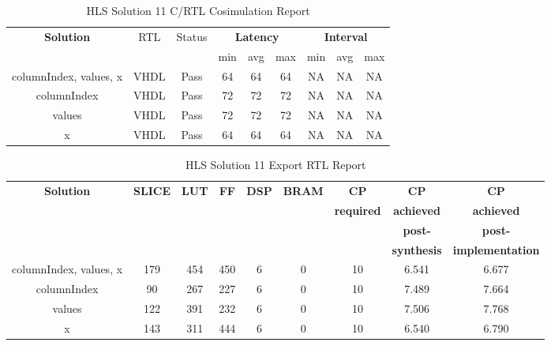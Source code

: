 \begin{table}[H]
	\centering
	\begin{tabular}{|c|c|c|c|c|c|c|c|c|}
		\hline
		\multicolumn{1}{|c|}{\textbf{Solution}} & \multicolumn{1}{|c|}{RTL} & \multicolumn{1}{|c|}{Status} & \multicolumn{3}{c|}{\textbf{Latency}} & \multicolumn{3}{c|}{\textbf{Interval}} \\
		& &  & min & avg & max & min & avg & max \\
		\hline
		columnIndex, values, x & VHDL & Pass & 64 & 64 & 64 & NA & NA & NA \\
		\hline
		columnIndex & VHDL & Pass & 72 & 72 & 72 & NA & NA & NA \\
		\hline
		values & VHDL & Pass & 72 & 72 & 72 & NA & NA & NA \\
		\hline
		x & VHDL & Pass & 64 & 64 & 64 & NA & NA & NA \\
		\hline
	\end{tabular}
	\caption{HLS Solution 11 C/RTL Cosimulation Report }
	\label{tab:hls-solution-11-cosimulation-report}
\end{table}

\begin{table}[H]
	\centering
	\begin{tabular}{|c|c|c|c|c|c|c|c|c|}
		\hline
		\textbf{Solution} & \textbf{SLICE} & \textbf{LUT} & \textbf{FF} & \textbf{DSP} & \textbf{BRAM} & \textbf{CP} & \textbf{CP} & \textbf{CP} \\
		& & & & & & \textbf{required} & \textbf{achieved} & \textbf{achieved}\\
		& & & & & & & \textbf{post-} & \textbf{post-}\\
		& & & & & & & \textbf{synthesis} & \textbf{implementation}\\
		\hline
		columnIndex, values, x  & 179 & 454 & 450 & 6 & 0 & 10 & 6.541 & 6.677 \\
		\hline
		columnIndex  & 90 & 267 & 227 & 6 & 0 & 10 & 7.489 & 7.664 \\
		\hline
		values  & 122 & 391 & 232 & 6 & 0 & 10 & 7.506 & 7.768 \\
		\hline
		x  & 143 & 311 & 444 & 6 & 0 & 10 & 6.540 & 6.790 \\
		\hline
	\end{tabular}
	\caption{HLS Solution 11 Export RTL Report}
	\label{tab:hls-solution-11-export-rtl-report}
\end{table}